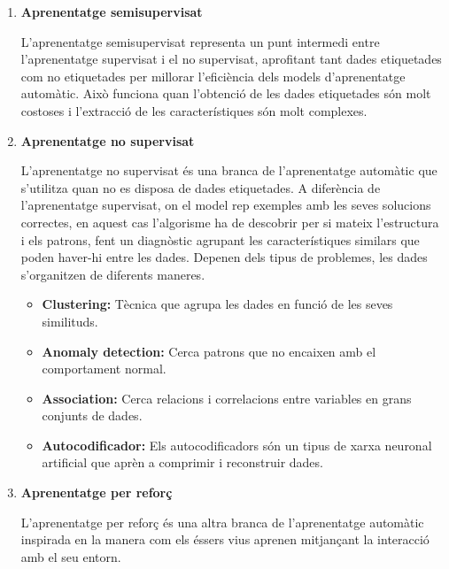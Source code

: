 \begin{enumerate}
\begin{enumerate}
                 \item \textbf{Aprenentatge semisupervisat}

                  L'aprenentatge semisupervisat representa un punt intermedi entre l'aprenentatge supervisat i el no supervisat, aprofitant tant dades etiquetades com no etiquetades per millorar l'eficiència dels models d'aprenentatge automàtic. Això funciona quan l'obtenció de les dades etiquetades són molt costoses i l'extracció de les característiques són molt complexes.

                  \item \textbf{Aprenentatge no supervisat}

                   L'aprenentatge no supervisat és una branca de l'aprenentatge automàtic que s'utilitza quan no es disposa de dades etiquetades. A diferència de l'aprenentatge supervisat, on el model rep exemples amb les seves solucions correctes, en aquest cas l'algorisme ha de descobrir per si mateix l'estructura i els patrons, fent un diagnòstic agrupant les característiques similars que poden haver-hi entre les dades.
                  Depenen dels tipus de problemes, les dades s'organitzen de diferents maneres.
                  \begin{itemize}
                   \item \textbf{Clustering:} Tècnica que agrupa les dades en funció de les seves similituds.
                   \item \textbf{Anomaly detection:} Cerca patrons que no encaixen amb el comportament normal.
                  \item \textbf{Association:} Cerca relacions i correlacions entre variables en grans conjunts de dades.
                   \item \textbf{Autocodificador:} Els autocodificadors són un tipus de xarxa neuronal artificial que aprèn a comprimir i reconstruir dades.
                 \end{itemize}
                  \item \hypertarget{Aprenentatge per reforç}{\textbf{Aprenentatge per reforç}}
                  L'aprenentatge per reforç és una altra branca de l'aprenentatge automàtic inspirada en la manera com els éssers vius aprenen mitjançant la interacció amb el seu entorn.

\end{enumerate}
\end{enumerate}

